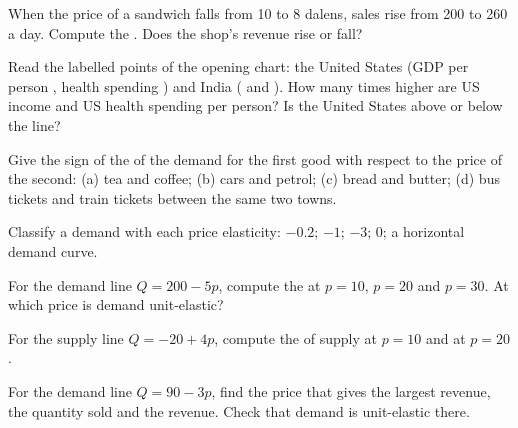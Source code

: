 \begin{exercise}[$\star$]\label{exo:g10:elasticities:2}
When the price of a sandwich falls from 10 to 8 dalens, sales rise from 200 to 260 a day. Compute the . Does the shop's revenue rise or
fall?
\end{exercise}

\begin{exercise}[$\star$]\label{exo:g10:elasticities:3}
Read the labelled points of the opening chart: the United States (GDP per person , health spending ) and India ( and
). How many times higher are US income and US health spending per person? Is the United States above or below the line?
\end{exercise}

\begin{exercise}[$\star$]\label{exo:g10:elasticities:4}
Give the sign of the  of the demand for the first good with respect to the price of the second: (a) tea and coffee; (b) cars and
petrol; (c) bread and butter; (d) bus tickets and train tickets between the same two towns.
\end{exercise}

\begin{exercise}[$\star$]\label{exo:g10:elasticities:5}
Classify a demand with each price elasticity: $-0.2$; $-1$; $-3$; $0$; a horizontal demand curve.
\end{exercise}

\begin{exercise}[$\star\star$]\label{exo:g10:elasticities:6}
For the demand line $Q = 200 - 5p$, compute the  at $p = 10$, $p = 20$ and $p = 30$. At which price is demand unit-elastic?
\end{exercise}

\begin{exercise}[$\star\star$]\label{exo:g10:elasticities:7}
For the supply line $Q = -20 + 4p$, compute the  of supply at $p = 10$ and at $p = 20$.
\end{exercise}

\begin{exercise}[$\star\star$]\label{exo:g10:elasticities:8}
For the demand line $Q = 90 - 3p$, find the price that gives the largest revenue, the quantity sold and the revenue. Check that demand is
unit-elastic there.
\end{exercise}

